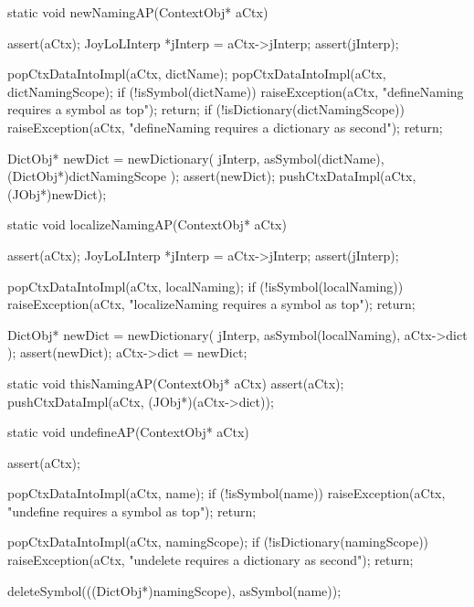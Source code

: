\startCCode
static void newNamingAP(ContextObj* aCtx) {
  assert(aCtx);
  JoyLoLInterp *jInterp = aCtx->jInterp;
  assert(jInterp);

  popCtxDataIntoImpl(aCtx, dictName);
  popCtxDataIntoImpl(aCtx, dictNamingScope);
  if (!isSymbol(dictName)) {
    raiseException(aCtx,
      "defineNaming requires a symbol as top");
    return;
  }
  if (!isDictionary(dictNamingScope)) {
    raiseException(aCtx,
      "defineNaming requires a dictionary as second");
    return;
  }

  DictObj* newDict =
    newDictionary(
      jInterp,
      asSymbol(dictName),
      (DictObj*)dictNamingScope
    );
  assert(newDict);
  pushCtxDataImpl(aCtx, (JObj*)newDict);
}
\stopCCode

\startCCode
static void localizeNamingAP(ContextObj* aCtx) {
  assert(aCtx);
  JoyLoLInterp *jInterp = aCtx->jInterp;
  assert(jInterp);
  
  popCtxDataIntoImpl(aCtx, localNaming);
  if (!isSymbol(localNaming)){
    raiseException(aCtx,
      "localizeNaming requires a symbol as top");
    return;
  }
  
  DictObj* newDict = 
    newDictionary(
      jInterp,
      asSymbol(localNaming),
      aCtx->dict
    );
  assert(newDict);
  aCtx->dict = newDict;
}
\stopCCode

\startCCode
static void thisNamingAP(ContextObj* aCtx) {
  assert(aCtx);
  pushCtxDataImpl(aCtx, (JObj*)(aCtx->dict));
}
\stopCCode

\startCCode
static void undefineAP(ContextObj* aCtx) {
  assert(aCtx);
  
  popCtxDataIntoImpl(aCtx, name);
  if (!isSymbol(name)) {
    raiseException(aCtx,
      "undefine requires a symbol as top");
    return;
  }
  
  popCtxDataIntoImpl(aCtx, namingScope);
  if (!isDictionary(namingScope)) {
    raiseException(aCtx,
      "undelete requires a dictionary as second");
    return;
  }
  
  deleteSymbol(((DictObj*)namingScope), asSymbol(name));
  }
\stopCCode

